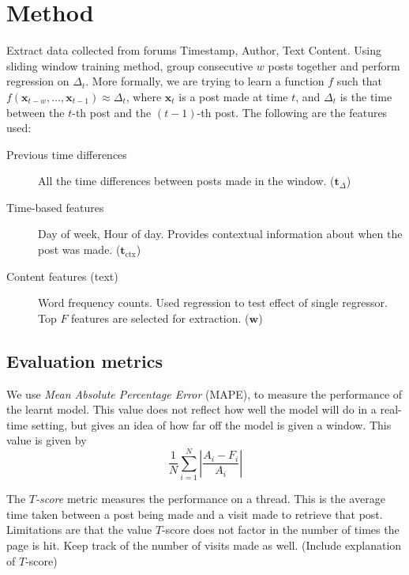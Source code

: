\documentclass[12 pt]{article}
\begin{document}
\newcommand{\vocab}{\mathbf{v}}
\newcommand{\dtvec}{\mathbf{t}_\Delta}
\newcommand{\ctxvec}{\mathbf{t}_\text{ctx}}
\newcommand{\dt}{\Delta_t}


\section{Method}

Extract data collected from forums Timestamp, Author, Text Content. Using sliding window training method, group consecutive $w$ posts together and perform regression on $\Delta_t$. More formally, we are trying to learn a function $f$ such that $f(\mathbf{x}_{t-w},\hdots, \mathbf{x}_{t-1}) \approx \Delta_{t}$, where $\mathbf{x}_t$ is a post made at time $t$, and $\Delta_t$ is the time between the $t$-th post and the $(t-1)$-th post. The following are the features used:
\begin{description}
	\item[Previous time differences] All the time differences between posts made in the window. ($\mathbf{t}_\Delta$)
	\item[Time-based features] Day of week, Hour of day. Provides contextual information about when the post was made. ($\mathbf{t}_{\text{ctx}}$)
	
	\item[Content features (text)] Word frequency counts. Used regression to test effect of single regressor. Top $F$ features are selected for extraction. ($\mathbf{w}$)

\end{description}

\subsection{Evaluation metrics}
We use \emph{Mean Absolute Percentage Error} (MAPE), to measure the performance of the learnt model. This value does not reflect how well the model will do in a real-time setting, but gives an idea of how far off the model is given a window. This value is given by
\[
	\frac{1}{N}\sum^N_{i=1}\left|\frac{A_i-F_i}{A_i}\right|
\]

The \emph{$T$-score} metric measures the performance on a thread. This is the average time taken between a post being made and a visit made to retrieve that post. Limitations are that the value $T$-score does not factor in the number of times the page is hit. Keep track of the number of visits made as well. (Include explanation of $T$-score)
\end{document}
